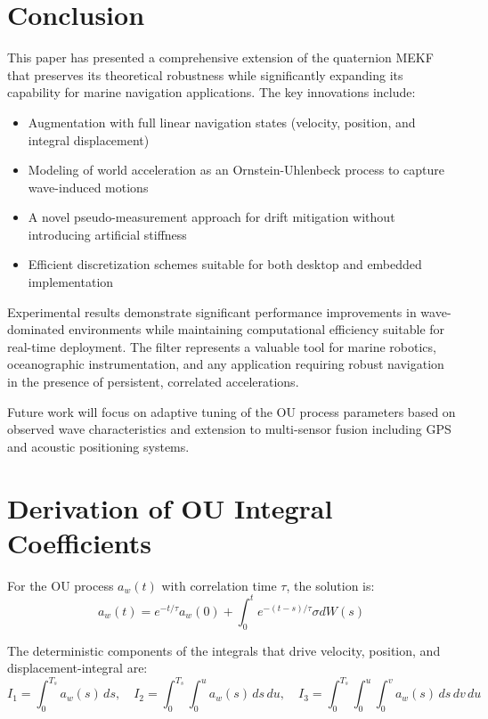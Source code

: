 \documentclass[11pt,letterpaper]{article}
\begin{document}
\section{Conclusion}
\label{sec:conclusion}

This paper has presented a comprehensive extension of the quaternion MEKF that preserves its theoretical robustness while significantly expanding its capability for marine navigation applications. The key innovations include:

\begin{itemize}
\item Augmentation with full linear navigation states (velocity, position, and integral displacement)
\item Modeling of world acceleration as an Ornstein-Uhlenbeck process to capture wave-induced motions
\item A novel pseudo-measurement approach for drift mitigation without introducing artificial stiffness
\item Efficient discretization schemes suitable for both desktop and embedded implementation
\end{itemize}

Experimental results demonstrate significant performance improvements in wave-dominated environments while maintaining computational efficiency suitable for real-time deployment. The filter represents a valuable tool for marine robotics, oceanographic instrumentation, and any application requiring robust navigation in the presence of persistent, correlated accelerations.

Future work will focus on adaptive tuning of the OU process parameters based on observed wave characteristics and extension to multi-sensor fusion including GPS and acoustic positioning systems.

\appendix
\section{Derivation of OU Integral Coefficients}
\label{app:ou_coefficients}

For the OU process $a_w(t)$ with correlation time $\tau$, the solution is:
\[
a_w(t) = e^{-t/\tau} a_w(0) + \int_0^t e^{-(t-s)/\tau} \sigma dW(s)
\]

The deterministic components of the integrals that drive velocity, position, and displacement-integral are:
\[
I_1=\int_0^{T_s} a_w(s)\,ds,\quad
I_2=\int_0^{T_s}\!\int_0^u a_w(s)\,ds\,du,\quad
I_3=\int_0^{T_s}\!\int_0^u\!\int_0^v a_w(s)\,ds\,dv\,du
\]
\end{document}
